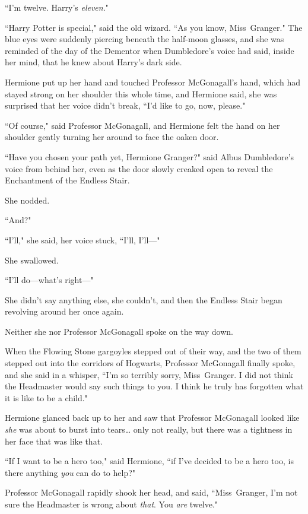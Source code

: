``I'm twelve. Harry's \emph{eleven}."

``Harry Potter is special," said the old wizard. ``As you know, Miss~Granger." The blue eyes were suddenly piercing beneath the half-moon glasses, and she was reminded of the day of the Dementor when Dumbledore's voice had said, inside her mind, that he knew about Harry's dark side.

Hermione put up her hand and touched Professor McGonagall's hand, which had stayed strong on her shoulder this whole time, and Hermione said, she was surprised that her voice didn't break, ``I'd like to go, now, please."

``Of course," said Professor McGonagall, and Hermione felt the hand on her shoulder gently turning her around to face the oaken door.

``Have you chosen your path yet, Hermione Granger?" said Albus Dumbledore's voice from behind her, even as the door slowly creaked open to reveal the Enchantment of the Endless Stair.

She nodded.

``And?"

``I'll," she said, her voice stuck, ``I'll, I'll—"

She swallowed.

``I'll do—what's right—"

She didn't say anything else, she couldn't, and then the Endless Stair began revolving around her once again.

Neither she nor Professor McGonagall spoke on the way down.

When the Flowing Stone gargoyles stepped out of their way, and the two of them stepped out into the corridors of Hogwarts, Professor McGonagall finally spoke, and she said in a whisper, ``I'm so terribly sorry, Miss~Granger. I did not think the Headmaster would say such things to you. I think he truly has forgotten what it is like to be a child."

Hermione glanced back up to her and saw that Professor McGonagall looked like \emph{she} was about to burst into tears{\ldots} only not really, but there was a tightness in her face that was like that.

``If I want to be a hero too," said Hermione, ``if I've decided to be a hero too, is there anything \emph{you} can do to help?"

Professor McGonagall rapidly shook her head, and said, ``Miss~Granger, I'm not sure the Headmaster is wrong about \emph{that}. You \emph{are} twelve."

